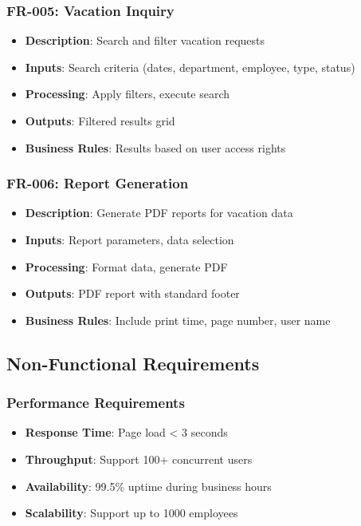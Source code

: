 \documentclass[12pt,a4paper]{article}
\begin{document}
\subsubsection{FR-005: Vacation Inquiry}
\begin{itemize}
    \item \textbf{Description}: Search and filter vacation requests
    \item \textbf{Inputs}: Search criteria (dates, department, employee, type, status)
    \item \textbf{Processing}: Apply filters, execute search
    \item \textbf{Outputs}: Filtered results grid
    \item \textbf{Business Rules}: Results based on user access rights
\end{itemize}

\subsubsection{FR-006: Report Generation}
\begin{itemize}
    \item \textbf{Description}: Generate PDF reports for vacation data
    \item \textbf{Inputs}: Report parameters, data selection
    \item \textbf{Processing}: Format data, generate PDF
    \item \textbf{Outputs}: PDF report with standard footer
    \item \textbf{Business Rules}: Include print time, page number, user name
\end{itemize}

\subsection{Non-Functional Requirements}

\subsubsection{Performance Requirements}
\begin{itemize}
    \item \textbf{Response Time}: Page load < 3 seconds
    \item \textbf{Throughput}: Support 100+ concurrent users
    \item \textbf{Availability}: 99.5\% uptime during business hours
    \item \textbf{Scalability}: Support up to 1000 employees
\end{itemize}
\end{document}
